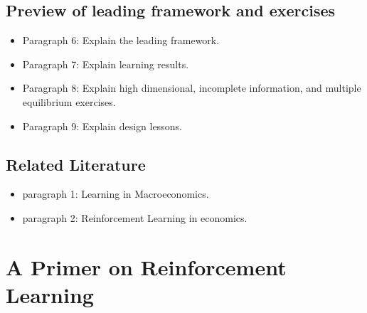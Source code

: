 \documentclass[11pt,english]{article}
\begin{document}
	\subsection{Preview of leading framework and exercises} 
	
	\begin{itemize}
	
	\item  Paragraph 6: Explain the leading framework. 
	
	\item Paragraph 7: Explain learning results.
	
	\item Paragraph 8: Explain high dimensional, incomplete information, and multiple equilibrium exercises.
	
	\item Paragraph 9: Explain design lessons.
	
\end{itemize}
	
	\subsection{Related Literature}
	
	\begin{itemize}
		\item paragraph 1: Learning in Macroeconomics. \medskip
		
		\item paragraph 2: Reinforcement Learning in economics. \medskip
	\end{itemize}
	

\section{A Primer on Reinforcement Learning}
\end{document}
